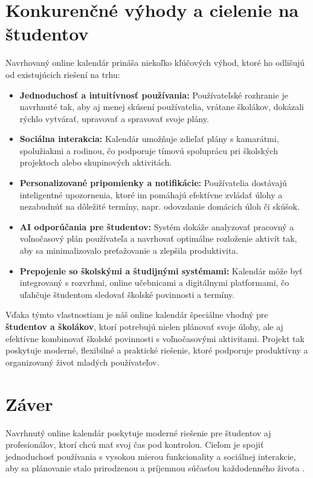 \documentclass[a4paper,12pt]{article}
\begin{document}
\section{Konkurenčné výhody a cielenie na študentov}

Navrhovaný online kalendár prináša niekoľko kľúčových výhod, ktoré ho odlišujú od existujúcich riešení na trhu:

\begin{itemize}
    \item \textbf{Jednoduchosť a intuitívnosť používania:} Používateľské rozhranie je navrhnuté tak, aby aj menej skúsení používatelia, vrátane školákov, dokázali rýchlo vytvárať, upravovať a spravovať svoje plány.
    \item \textbf{Sociálna interakcia:} Kalendár umožňuje zdieľať plány s kamarátmi, spolužiakmi a rodinou, čo podporuje tímovú spoluprácu pri školských projektoch alebo skupinových aktivitách.
    \item \textbf{Personalizované pripomienky a notifikácie:} Používatelia dostávajú inteligentné upozornenia, ktoré im pomáhajú efektívne zvládať úlohy a nezabudnúť na dôležité termíny, napr. odovzdanie domácich úloh či skúšok.
    \item \textbf{AI odporúčania pre študentov:} Systém dokáže analyzovať pracovný a voľnočasový plán používateľa a navrhovať optimálne rozloženie aktivít tak, aby sa minimalizovalo preťažovanie a zlepšila produktivita.
    \item \textbf{Prepojenie so školskými a študijnými systémami:} Kalendár môže byť integrovaný s rozvrhmi, online učebnicami a digitálnymi platformami, čo uľahčuje študentom sledovať školské povinnosti a termíny.
\end{itemize}

Vďaka týmto vlastnostiam je náš online kalendár špeciálne vhodný pre \textbf{študentov a školákov}, ktorí potrebujú nielen plánovať svoje úlohy, ale aj efektívne kombinovať školské povinnosti s voľnočasovými aktivitami. Projekt tak poskytuje moderné, flexibilné a praktické riešenie, ktoré podporuje produktívny a organizovaný život mladých používateľov.

\section{Záver}
Navrhnutý online kalendár poskytuje moderné riešenie pre študentov aj profesionálov, ktorí chcú mať svoj čas pod kontrolou.  
Cieľom je spojiť jednoduchosť používania s vysokou mierou funkcionality a sociálnej interakcie, aby sa plánovanie stalo prirodzenou a príjemnou súčasťou každodenného života \cite{norman_design}.
\end{document}
